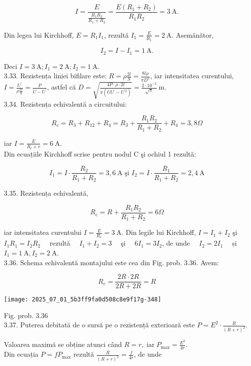 $$
I=\frac{E}{\frac{R_{1} R_{2}}{R_{1}+R_{2}}}=\frac{E\left(R_{1}+R_{2}\right)}{R_{1} R_{2}}=3 \mathrm{~A} .
$$

Din legea lui Kirchhoff, $E=R_{1} I_{1}$, rezultă $I_{1}=\frac{E}{R_{1}}=2 \mathrm{~A}$. Asemănător,

$$
I_{2}=I-I_{1}=1 \mathrm{~A} .
$$

Deci $I=3 \mathrm{~A} ; I_{1}=2 \mathrm{~A} ; I_{2}=1 \mathrm{~A}$.\\
3.33. Rezistența liniei bifilare este: $R=\rho \frac{2 l}{S}=\frac{8 l \rho}{\pi D^{2}}$, iar intensitatea curentului, $I=\frac{U^{\prime}}{\rho \frac{2 l}{S}}=\frac{P}{U-U^{\prime}}$, astfel că $D=\sqrt{\frac{4 P \cdot \rho \cdot 2 l}{\pi\left(U U^{\prime}-U^{\prime 2}\right)}}=\frac{2 \cdot 10^{-2}}{\sqrt{\pi}} \mathrm{~m}$.\\
3.34. Rezistența echivalentă a circuitului:

$$
R_{c}=R_{3}+R_{12}+R_{4}=R_{3}+\frac{R_{1} R_{2}}{R_{1}+R_{2}}+R_{4}=3,8 \Omega
$$

iar $I=\frac{E}{R_{c}+r}=6 \mathrm{~A}$.\\
Din ecuațiile Kirchhoff scrise pentru nodul C şi ochiul 1 rezultă:

$$
I_{1}=I \cdot \frac{R_{2}}{R_{1}+R_{2}}=3,6 \mathrm{~A} \text { şi } I_{2}=I \cdot \frac{R_{1}}{R_{1}+R_{2}}=2,4 \mathrm{~A}
$$

3.35. Rezistența echivalentă,

$$
R_{e}=R+\frac{R_{1} R_{2}}{R_{1}+R_{2}}=6 \Omega
$$

iar intensitatea curentului $I=\frac{E}{R_{e}}=3 \mathrm{~A}$. Din legile lui Kirchhoff, $I=I_{1}+I_{2}$ şi $I_{1} R_{1}=I_{2} R_{2} \quad$ rezultă $\quad I_{1}+I_{2}=3 \quad$ şi $\quad 6 I_{1}=3 I_{2}$, de unde $\quad I_{2}=2 I_{1} \quad$ și $I_{1}=1 \mathrm{~A}, I_{2}=2 \mathrm{~A}$.\\
3.36. Schema echivalentă montajului este cea din Fig. prob. 3.36. Avem:

$$
R_{e}=\frac{2 R \cdot 2 R}{2 R+2 R}=R
$$

\begin{center}
\texttt{[image: 2025\_07\_01\_5b3ff9fa0d508c8e9f17g-348]}
\end{center}

Fig. prob. 3.36\\
3.37. Puterea debitată de o sursă pe o rezistență exterioară este $P=E^{2} \cdot \frac{R}{(R+r)^{2}}$.

Valoarea maximă se obține atunci când $R=r, \operatorname{iar} P_{\max }=\frac{E^{2}}{4 r}$.\\
Din ecuația $P=f P_{\max }$ rezultă $\frac{R}{(R+r)^{2}}=\frac{f}{4 r}$, de unde

